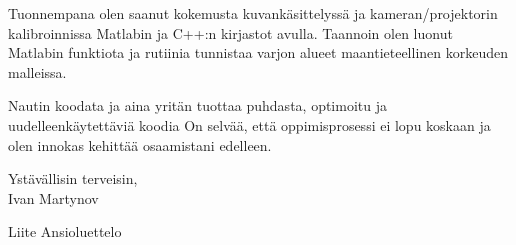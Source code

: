 \documentclass[]{article}
\begin{document}
\noindent
Tuonnempana olen saanut kokemusta kuvank\"asittelyss\"a ja kameran/projektorin
kalibroinnissa Matlabin ja C++:n kirjastot avulla. Taannoin olen luonut Matlabin
funktiota ja rutiinia tunnistaa varjon alueet maantieteellinen korkeuden
malleissa.\medskip

\noindent
Nautin koodata ja aina yrit\"an tuottaa puhdasta, optimoitu ja
uudelleenk\"aytett\"avi\"a koodia On selv\"a\"a, ett\"a oppimisprosessi ei lopu
koskaan ja olen innokas kehitt\"a\"a osaamistani edelleen.
\medskip

\noindent

\bigskip

\noindent
Yst\"av\"allisin terveisin,\\
Ivan Martynov\bigskip

\noindent
Liite	Ansioluettelo
\end{document}
